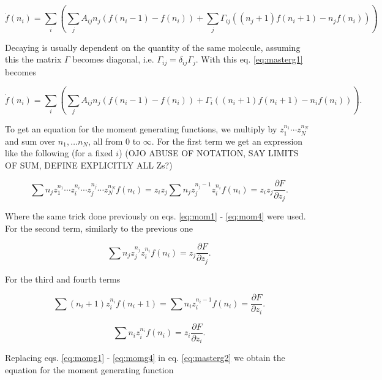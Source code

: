 \begin{equation}
\label{eq:masterg1}
\dot{f}(n_i) =  \sum_i\left(\sum_j A_{ij}n_j \left( f(n_i-1) - f(n_i) \right) + \sum_j \Gamma_{ij}((n_j+1)f(n_i+1)-n_jf(n_i))\right)
\end{equation}

Decaying is usually dependent on the quantity of the same molecule, assuming this the matrix $\Gamma$ becomes diagonal, i.e. $\Gamma_{ij}=\delta_{ij}\Gamma_j$. With this eq. \ref{eq:masterg1} becomes

\begin{equation}
\label{eq:masterg2}
\dot{f}(n_i) =  \sum_i\left(\sum_j A_{ij}n_j \left( f(n_i-1) - f(n_i) \right) + \Gamma_{i}((n_i+1)f(n_i+1)-n_if(n_i))\right).
\end{equation}

To get an equation for the moment generating functions, we multiply by $z_1^{n_1}\dotsm z_N^{n_N}$ and sum over $n_1,\dotsc n_N$, all from $0$ to $\infty$. For the first term we get an expression like the following (for a fixed $i$) (OJO ABUSE OF NOTATION, SAY LIMITS OF SUM, DEFINE EXPLICITLY ALL Zs?)

\begin{equation}
\label{eq:momg1}
\sum n_j z_1^{n_1}\dotsm z_i^{n_i}\dotsm z_j^{n_j}\dotsm z_N^{n_N} f(n_i) = z_iz_j\sum n_jz_j^{n_j-1}z_i^{n_i}f(n_i) = z_iz_j\frac{\partial F}{\partial z_j}. 
\end{equation} 

Where the same trick done previously on eqs. \ref{eq:mom1} - \ref{eq:mom4} were used. For the second term, similarly to the previous one

\begin{equation}
\label{eq:momg2}
\sum n_jz_j^{n_j}z_i^{n_i}f(n_i) = z_j\frac{\partial F}{\partial z_j}.
\end{equation}

For the third and fourth terms

\begin{equation}
\label{eq:momg3}
\sum (n_i+1)z_i^{n_i}f(n_i+1) = \sum n_i z_i^{n_i-1}f(n_i) = \frac{\partial F}{\partial z_i}.
\end{equation}

\begin{equation}
\label{eq:momg4}
\sum n_iz_i^{n_i}f(n_i) = z_i\frac{\partial F}{\partial z_i}.
\end{equation}

Replacing eqs. \ref{eq:momg1} - \ref{eq:momg4} in eq. \ref{eq:masterg2} we obtain the equation for the moment generating function


